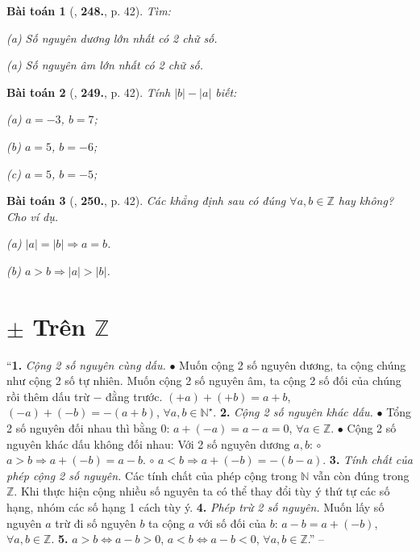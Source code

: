 \documentclass{article}
\numberwithin{equation}{section}
\newtheorem{baitoan}{Bài toán}
\begin{document}
\begin{baitoan}[\cite{Binh_Toan_6_tap_1}, \textbf{248.}, p. 42]
	Tìm:
	\begin{enumerate*}
		\item[(a)] Số nguyên dương lớn nhất có 2 chữ số.
		\item[(a)] Số nguyên âm lớn nhất có 2 chữ số.
	\end{enumerate*}
\end{baitoan}

\begin{baitoan}[\cite{Binh_Toan_6_tap_1}, \textbf{249.}, p. 42]
	Tính $|b| - |a|$ biết: 
	\begin{enumerate*}
		\item[(a)] $a = -3$, $b = 7$;
		\item[(b)] $a = 5$, $b = -6$;
		\item[(c)] $a = 5$, $b = -5$;
	\end{enumerate*}
\end{baitoan}

\begin{baitoan}[\cite{Binh_Toan_6_tap_1}, \textbf{250.}, p. 42]
	Các khẳng định sau có đúng $\forall a,b\in\mathbb{Z}$ hay không? Cho ví dụ.
	\begin{enumerate*}
		\item[(a)] $|a| = |b|\Rightarrow a = b$.
		\item[(b)] $a > b\Rightarrow|a| > |b|$.
	\end{enumerate*}
\end{baitoan}


\section{$\pm$ Trên $\mathbb{Z}$}
``\textbf{1.} \textit{Cộng 2 số nguyên cùng dấu.} $\bullet$ Muốn cộng 2 số nguyên dương, ta cộng chúng như cộng 2 số tự nhiên. Muốn cộng 2 số nguyên âm, ta cộng 2 số đối của chúng rồi thêm dấu trừ $-$ đằng trước. $(+a) + (+b) = a + b$, $(-a) + (-b) = -(a + b)$, $\forall a,b\in\mathbb{N}^\star$. \textbf{2.} \textit{Cộng 2 số nguyên khác dấu.} $\bullet$ Tổng 2 số nguyên đối nhau thì bằng $0$: $a + (-a) = a - a = 0$, $\forall a\in\mathbb{Z}$. $\bullet$ Cộng 2 số nguyên khác dấu không đối nhau: Với 2 số nguyên dương $a,b$: $\circ$ $a > b\Rightarrow a + (-b) = a - b$. $\circ$ $a < b\Rightarrow a + (-b) = -(b - a)$. \textbf{3.} \textit{Tính chất của phép cộng 2 số nguyên.} Các tính chất của phép cộng trong $\mathbb{N}$ vẫn còn đúng trong $\mathbb{Z}$. Khi thực hiện cộng nhiều số nguyên ta có thể thay đổi tùy ý thứ tự các số hạng, nhóm các số hạng 1 cách tùy ý. \textbf{4.} \textit{Phép trừ 2 số nguyên.} Muốn lấy số nguyên $a$ trừ đi số nguyên $b$ ta cộng $a$ với số đối của $b$: $a - b = a + (-b)$, $\forall a,b\in\mathbb{Z}$. \textbf{5.} $a > b\Leftrightarrow a - b > 0$, $a < b\Leftrightarrow a - b < 0$, $\forall a,b\in\mathbb{Z}$.'' -- \cite[Chap. 2, \S2, p. 37]{Tuyen_Toan_6}
\end{document}
